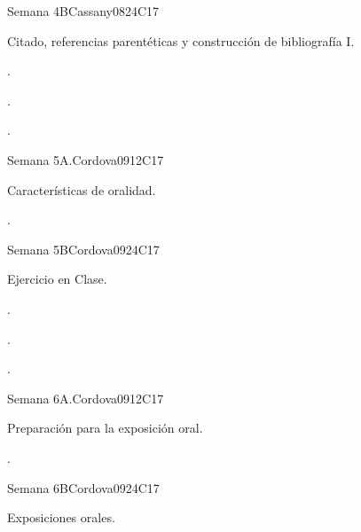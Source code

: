 \begin{syllabus}
\begin{unit}{Semana 4B}{}{Cassany08}{24}{C17}
   \begin{topics}
      \item Citado, referencias parentéticas y construcción de bibliografía I.
   \end{topics}

   \begin{learningoutcomes}
      \item . 
      \item .
      \item . 
      \end{learningoutcomes}
\end{unit}

\begin{unit}{Semana 5A.}{}{Cordova09}{12}{C17}
   \begin{topics}
      \item Características de oralidad.
   \end{topics}
   \begin{learningoutcomes}
      \item . 
   \end{learningoutcomes}
\end{unit}

\begin{unit}{Semana 5B}{}{Cordova09}{24}{C17}
   \begin{topics}
      \item Ejercicio en Clase.
   \end{topics}

   \begin{learningoutcomes}
      \item . 
      \item .
      \item . 
      \end{learningoutcomes}
\end{unit}

\begin{unit}{Semana 6A.}{}{Cordova09}{12}{C17}
   \begin{topics}
      \item Preparación para la exposición oral. 
   \end{topics}
   \begin{learningoutcomes}
      \item . 
   \end{learningoutcomes}
\end{unit}

\begin{unit}{Semana 6B}{}{Cordova09}{24}{C17}
   \begin{topics}
      \item Exposiciones orales.
   \end{topics}


\end{unit}
\end{syllabus}
